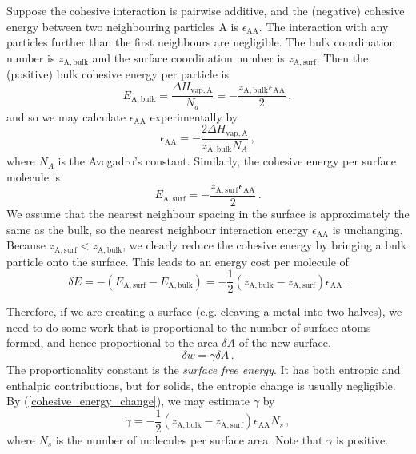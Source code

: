 \documentclass{article}
\theoremstyle{plain}\theoremheaderfont{\normalfont\itshape}\theorembodyfont{\rmfamily}\theoremseparator{.}\newtheorem*{rem}{Remark}\newtheorem*{ex}{Example}\newtheorem*{proof}{Proof}\newtheorem*{altp}{Alternative proof}
\theoremstyle{plain}\theoremheaderfont{\normalfont\bfseries}\theorembodyfont{\rmfamily}\theoremseparator{.}\newtheorem{thm}{Theorem}[section]\newtheorem{lem}[thm]{Lemma}\newtheorem{prop}[thm]{Proposition}\newtheorem*{cor}{Corollary}\newtheorem{defn}[thm]{Definition}\newtheorem{clm}[thm]{Claim}\newtheorem{clminproof}{Claim}\newtheorem*{law}{Law}\newtheorem{pos}[thm]{Postulate}
\theoremstyle{break}\theoremheaderfont{\normalfont\itshape}\theorembodyfont{\rmfamily}\theoremseparator{.\medskip}\newtheorem*{proofskip}{Proof}\newtheorem*{exs}{Examples}\newtheorem*{rems}{Remarks}
\theoremstyle{break}\theoremheaderfont{\normalfont\bfseries}\theorembodyfont{\rmfamily}\theoremseparator{.\medskip}\newtheorem{lemskip}[thm]{Lemma}\newtheorem{defnskip}[thm]{Definition}\newtheorem{propskip}[thm]{Proposition}\newtheorem{thmskip}[thm]{Theorem}
\numberwithin{equation}{section}
\newcommand{\A}{\mathrm{A}}
\newcommand{\bulk}{\text{bulk}}
\newcommand{\surf}{\text{surf}}
\begin{document}
	Suppose the cohesive interaction is pairwise additive, and the (negative) cohesive energy between two neighbouring particles \(\A\) is \(\epsilon_{\A\A}\). The interaction with any particles further than the first neighbours are negligible. The bulk coordination number is \(z_{\A,\bulk}\) and the surface coordination number is \(z_{\A,\surf}\). Then the (positive) bulk cohesive energy per particle is
	\begin{equation}
		E_{\A,\bulk}=\frac{\Delta H_{\text{vap},\A}}{N_a}=-\frac{z_{\A,\bulk}\epsilon_{\A\A}}{2}\,,
	\end{equation}
	and so we may calculate \(\epsilon_{\A\A}\) experimentally by
	\begin{equation}
		\epsilon_{\A\A}=-\frac{2\Delta H_{\text{vap},\A}}{z_{\A,\bulk} N_A}\,,
	\end{equation}
	where \(N_A\) is the Avogadro's constant. Similarly, the cohesive energy per surface molecule is
	\begin{equation}
		E_{\A,\surf}=-\frac{z_{\A,\surf}\epsilon_{\A\A}}{2}\,.
	\end{equation}
	We assume that the nearest neighbour spacing in the surface is approximately the same as the bulk, so the nearest neighbour interaction energy \(\epsilon_{\A\A}\) is unchanging. Because \(z_{\A,\surf}<z_{\A,\bulk}\), we clearly reduce the cohesive energy by bringing a bulk particle onto the surface. This leads to an energy cost per molecule of
	\begin{equation}\label{cohesive_energy_change}
		\delta E=-(E_{\A,\surf}-E_{\A,\bulk})=-\frac{1}{2}(z_{\A,\bulk}-z_{\A,\surf})\epsilon_{\A\A}\,.
	\end{equation}

	Therefore, if we are creating a surface (e.g. cleaving a metal into two halves), we need to do some work that is proportional to the number of surface atoms formed, and hence proportional to the area \(\delta A\) of the new surface.
	\begin{equation}
		\delta w=\gamma\delta A\,.
	\end{equation}
	The proportionality constant is the \textit{surface free energy}. It has both entropic and enthalpic contributions, but for solids, the entropic change is usually negligible. By (\ref{cohesive_energy_change}), we may estimate \(\gamma\) by
	\begin{equation}
		\gamma=-\frac{1}{2}(z_{\A,\bulk}-z_{\A,\surf})\epsilon_{\A\A}N_s\,,
	\end{equation}
	where \(N_s\) is the number of molecules per surface area. Note that \(\gamma\) is positive.
\end{document}
